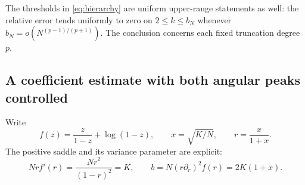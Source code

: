 \documentclass[11pt]{article}
\theoremstyle{definition}
\theoremstyle{remark}
\newcommand{\1}{\mathbf 1}
\begin{document}
The thresholds in \eqref{eq:hierarchy} are uniform upper-range statements as well: the relative error tends uniformly to zero on $2\le k\le b_N$ whenever $b_N=o(N^{(p-1)/(p+1)})$. The conclusion concerns each fixed truncation degree $p$.

\subsection{A coefficient estimate with both angular peaks controlled}

Write
\[
f(z)=\frac{z}{1-z}+\log(1-z),\qquad
x=\sqrt{K/N},\qquad r=\frac{x}{1+x}.
\]
The positive saddle and its variance parameter are explicit:
\begin{equation}\label{eq:saddleequation}
Nrf'(r)=\frac{Nr^2}{(1-r)^2}=K,\qquad
b=N(r\partial_r)^2f(r)=2K(1+x).
\end{equation}
\end{document}
